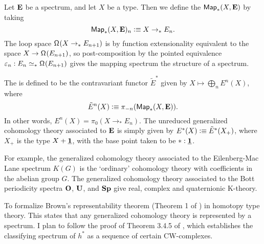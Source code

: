 \documentclass[reqno]{amsart}
\begin{document}
Let $\mathbf{E}$ be a spectrum, and let $X$ be a type. Then we define the
 $\mathsf{Map}_\ast(X,\mathbf{E})$ by taking
\begin{equation*}
\mathsf{Map}_\ast(X,\mathbf{E})_n \vcentcolon\equiv X \to_\ast E_n.
\end{equation*}
The loop space $\mathsf{\Omega}^{}(X\to_\ast E_{n+1})$ is by function extensionality
equivalent to the space $X\to\mathsf{\Omega}^{}(E_{n+1})$, so post-composition by the
pointed equivalence $\varepsilon_n : E_n \simeq_\ast \mathsf{\Omega}^{}(E_{n+1})$ gives
the mapping spectrum the structure of a spectrum. 

The  is defined to be the contravariant functor $\tilde{E}^\ast$ given by $X\mapsto \bigoplus_n E^n(X)$, where
\begin{equation*}
\tilde{E}^n(X)\vcentcolon\equiv \pi_{-n}(\mathsf{Map}_\ast(X,\mathbf{E})).
\end{equation*}
In other words, $E^n(X)=\pi_0(X\to_\ast E_n)$. The unreduced generalized cohomology
theory associated to $\mathbf{E}$ is simply given by $E^\ast(X)\vcentcolon\equiv \tilde{E}^\ast(X_+)$,
where $X_+$ is the type $X+\underline{\mathbf{1}}$, with the base point taken to be $\ast:\underline{\mathbf{1}}$.

For example, the generalized cohomology theory associated
to the Eilenberg-Mac Lane spectrum $K(G)$ is the `ordinary' cohomology theory
with coefficients in the abelian group $G$. The generalized cohomology theory
associated to the Bott periodicity spectra $\mathbf{O}$, $\mathbf{U}$, and
$\mathbf{Sp}$ give real, complex and quaternionic K-theory. 

\begin{proposal}\label{p:brown}
To formalize Brown's representability theorem (Theorem 1 of \cite{Brown62}) in
homotopy type theory. This states that any generalized cohomology theory
is represented by a spectrum. I plan to follow the proof of Theorem 3.4.5 of
\cite{Kochman96}, which establishes the classifying spectrum of $h^\ast$ as a 
sequence of certain CW-complexes.
\end{proposal}
\end{document}
